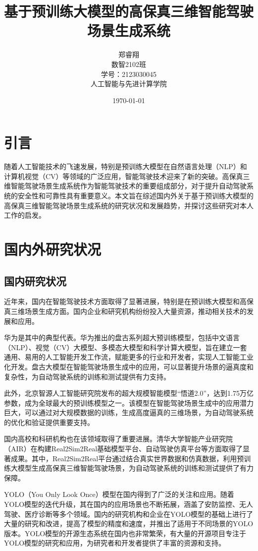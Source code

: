 \documentclass{article}
\title{基于预训练大模型的高保真三维智能驾驶场景生成系统}
\author{郑睿翔 \\数智2102班 \\ 学号：2123030045\\人工智能与先进计算学院}
\date{\today}
\begin{document}
\maketitle

\section*{引言}
随着人工智能技术的飞速发展，特别是预训练大模型在自然语言处理（NLP）和计算机视觉（CV）等领域的广泛应用，智能驾驶技术迎来了新的突破。高保真三维智能驾驶场景生成系统作为智能驾驶技术的重要组成部分，对于提升自动驾驶系统的安全性和可靠性具有重要意义。本文旨在综述国内外关于基于预训练大模型的高保真三维智能驾驶场景生成系统的研究状况和发展趋势，并探讨这些研究对本人工作的启发。

\section*{国内外研究状况}

\subsection*{国内研究状况}
近年来，国内在智能驾驶技术方面取得了显著进展，特别是在预训练大模型和高保真三维场景生成方面。国内企业和研究机构纷纷投入大量资源，推动相关技术的发展和应用。

华为是其中的典型代表。华为推出的盘古系列超大预训练模型，包括中文语言（NLP）、视觉（CV）大模型、多模态大模型和科学计算大模型，旨在建立一套通用、易用的人工智能开发工作流，赋能更多的行业和开发者，实现人工智能工业化开发。盘古大模型在智能驾驶场景生成中的应用，可以显著提升场景的逼真度和复杂性，为自动驾驶系统的训练和测试提供有力支持。

此外，北京智源人工智能研究院发布的超大规模智能模型“悟道2.0”，达到1.75万亿参数，成为全球最大的预训练模型之一。该模型在智能驾驶场景生成中的应用潜力巨大，可以通过对大规模数据的训练，生成高度逼真的三维场景，为自动驾驶系统的优化和验证提供重要支持。

国内高校和科研机构也在该领域取得了重要进展。清华大学智能产业研究院（AIR）在构建Real2Sim2Real基础模型平台、自动驾驶仿真平台等方面取得了显著成果。其中，Real2Sim2Real平台通过结合真实世界数据和仿真数据，利用预训练大模型生成高保真三维智能驾驶场景，为自动驾驶系统的训练和测试提供了有力保障。

YOLO（You Only Look Once）模型在国内得到了广泛的关注和应用。随着YOLO模型的迭代升级，其在国内的应用场景也不断拓展，涵盖了安防监控、无人驾驶、医疗诊断等多个领域。国内的研究机构和企业在YOLO模型的基础上进行了大量的研究和改进，提高了模型的精度和速度，并推出了适用于不同场景的YOLO版本。YOLO模型的开源生态系统在国内也非常繁荣，有大量的开源项目专注于YOLO模型的研究和应用，为研究者和开发者提供了丰富的资源和支持。
\end{document}
